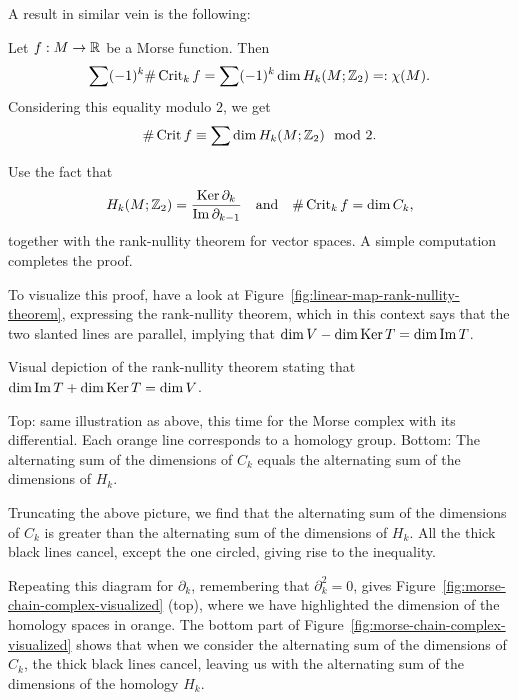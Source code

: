 A result in similar vein is the following:
\begin{theorem}
    Let $f: M \to  \mathbb{R}$ be a Morse function. Then
    \[
        \sum (-1)^{k} \# \operatorname{Crit}_k f = \sum (-1)^{k} \dim H_k(M; \mathbb{Z}_2)  =: \chi(M)
    .\]
    Considering this equality modulo $2$, we get
    \[
        \# \operatorname{Crit} f  \equiv \sum \dim H_k(M; \mathbb{Z}_2) \mod 2
    .\]
\end{theorem}
\begin{myproof}
    Use the fact that 
    \[
        H_k(M; \mathbb{Z}_2) = \frac{\operatorname{Ker} \partial_k}{\operatorname{Im} \partial_{k-1}} \quad \text{and} \quad \# \operatorname{Crit}_k f = \dim C_k,
    \]
    together with the rank-nullity theorem for vector spaces.
    A simple computation completes the proof.

    To visualize this proof, have a look at Figure~\ref{fig:linear-map-rank-nullity-theorem}, expressing the rank-nullity theorem, which in this context says that the two slanted lines are parallel, implying that $\dim V - \dim \operatorname{Ker} T = \dim \operatorname{Im} T$.
    \begin{marginfigure}
        \centering
        \caption{Visual depiction of the rank-nullity theorem stating that $\dim \operatorname{Im} T + \dim \operatorname{Ker} T = \dim V$.}
        \label{fig:linear-map-rank-nullity-theorem}
    \end{marginfigure}
    \begin{marginfigure}
        \centering
        \caption{
            Top: same illustration as above, this time for the Morse complex with its differential.
            Each orange line corresponds to a homology group.
            Bottom: The alternating sum of the dimensions of $C_k$ equals the alternating sum of the dimensions of $H_k$.
        }
        \label{fig:morse-chain-complex-visualized}
    \end{marginfigure}
    \begin{marginfigure}
        \centering
        \caption{Truncating the above picture, we find that the alternating sum of the dimensions of $C_k$ is greater than the alternating sum of the dimensions of  $H_k$. All the thick black lines cancel, except the one circled, giving rise to the inequality.
        }
        \label{fig:morse-chain-complex-visualized-truncated}
    \end{marginfigure}
    Repeating this diagram for $\partial_k$, remembering that  $\partial_k^2 = 0$, gives Figure~\ref{fig:morse-chain-complex-visualized} (top), where we have highlighted the dimension of the homology spaces in orange.
    The bottom part of Figure~\ref{fig:morse-chain-complex-visualized} shows that when we consider the alternating sum of the dimensions of $C_k$, the thick black lines cancel, leaving us with the alternating sum of the dimensions of the homology $H_k$.
    \end{myproof}

